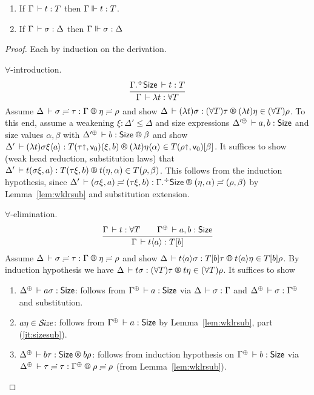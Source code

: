 \documentclass[acmlarge,review,anonymous]{acmart}\settopmatter{printfolios=true}
\begin{document}
\begin{theorem}
  \bla
  \begin{enumerate}
  \item
  If $\Gamma \,\vdash t : T$ then $\Gamma \Vdash t : T$.
  \item
  If $\Gamma \,\vdash \sigma : \Delta$ then
  $\Gamma \Vdash \sigma : \Delta$
  \end{enumerate}
\end{theorem}
\begin{proof}
Each by induction on the derivation.

\begin{caselist}

\nextcase $\forall$-introduction.
\[
  \ru{\erext \Gamma \Size \der t : T
    }{\Gamma \der \lambda t : \forall T}
\]
Assume $\LRSub {\Delta} {\sigma} {\tau} \Gamma {\eta} {\rho}$ and show
$\LR \Delta {(\lambda t)\sigma} {(\forall T)\tau} {(\lambda t)\eta} {(\forall T)\rho}$.
To this end, assume a weakening $\xi : \Delta' \leq \Delta$ and
size expressions %
$\resurrect{\Delta'} \der a, b : \Size$ and size values $\alpha,\beta$ with
$\LRSize {\resurrect{\Delta'}} b \beta$ and show
$\LR {\Delta'} {(\lambda t)\sigma\xi \ann a} {T(\tau \slift, \ind 0)(\xi,b)} {(\lambda t)\eta \ann \alpha} {T(\rho\slift, \ind 0)[\beta]}$.
It suffices to show (weak head reduction, substitution laws) that
$\LR {\Delta'} {t(\sigma\xi,a)} {T(\tau\xi,b)} {t(\eta,\alpha)} {T(\rho,\beta)}$.
This follows from the induction hypothesis, since
$\LRSub {\Delta'} {(\sigma\xi,a)} {(\tau\xi,b)} {\erext \Gamma \Size} {(\eta,\alpha)} {(\rho,\beta)}$
by Lemma~\ref{lem:wklrsub} and substitution extension.

\nextcase $\forall$-elimination.
\[
  \ru{\Gamma \der t : \forall T \qquad %
      \resurrect \Gamma \der a,b : \Size
    }{\Gamma \der t \ann a : T[b]}
\]
Assume $\LRSub {\Delta} {\sigma} {\tau} \Gamma {\eta} {\rho}$ and show
$\LR \Delta {t \ann a \sigma} {T[b]\tau} {t \ann a \eta} {T[b]\rho}$.
By induction hypothesis we have $\LR \Delta {t \sigma} {(\forall T)\tau} {t \eta} {(\forall T) \rho}$.
It suffices to show
\begin{enumerate}
\item $\resurrect\Delta \der a\sigma : \Size$: follows from $\resurrect\Gamma \der a : \Size$
  via $\Delta \,\vdash \sigma : \Gamma$ and $\resurrect\Delta \der \sigma : \resurrect\Gamma$
  and substitution.
\item $a\eta \in \mathcal{S}\!\mathit{ize}$: follows from $\resurrect\Gamma \der a : \Size$
  by Lemma~\ref{lem:wklrsub}, part (\ref{it:sizesub}).
\item $\LRSize {\resurrect \Delta} {b\tau} {b\rho}$: follows from induction hypothesis on $\resurrect \Gamma \der b : \Size$ via $\LRSub {\resurrect \Delta} \tau \tau {\resurrect\Gamma} \rho \rho$ (from Lemma~\ref{lem:wklrsub}).
\end{enumerate}

\end{caselist}
\end{proof}
\end{document}
